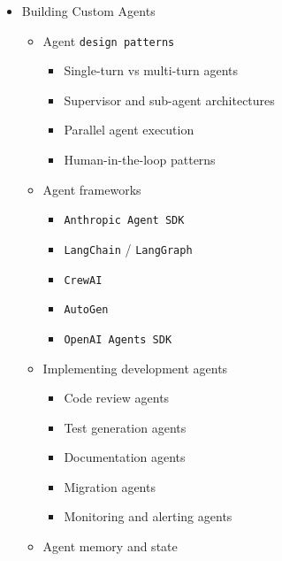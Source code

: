 \documentclass[
]{article}
\providecommand{\tightlist}{%
  \setlength{\itemsep}{0pt}\setlength{\parskip}{0pt}}
\begin{document}
\begin{itemize}
\begin{itemize}
    \begin{itemize}
    \tightlist
    \item
      Priority-based context \texttt{assembly}
    \item
      Summarization and compression
    \item
      Sliding window approaches
    \end{itemize}
  \item
    Evaluating and iterating on prompts
  \item
    Prompt security: injection attacks and defenses
  \end{itemize}
\item
  Building Custom Agents

  \begin{itemize}
  \tightlist
  \item
    Agent \texttt{design\ patterns}

    \begin{itemize}
    \tightlist
    \item
      Single-turn vs multi-turn agents
    \item
      Supervisor and sub-agent architectures
    \item
      Parallel agent execution
    \item
      Human-in-the-loop patterns
    \end{itemize}
  \item
    Agent frameworks

    \begin{itemize}
    \tightlist
    \item
      \texttt{Anthropic\ Agent\ SDK}
    \item
      \texttt{LangChain} / \texttt{LangGraph}
    \item
      \texttt{CrewAI}
    \item
      \texttt{AutoGen}
    \item
      \texttt{OpenAI\ Agents\ SDK}
    \end{itemize}
  \item
    Implementing development agents

    \begin{itemize}
    \tightlist
    \item
      Code review agents
    \item
      Test generation agents
    \item
      Documentation agents
    \item
      Migration agents
    \item
      Monitoring and alerting agents
    \end{itemize}
  \item
    Agent memory and state


\end{itemize}
\end{itemize}
\end{document}
